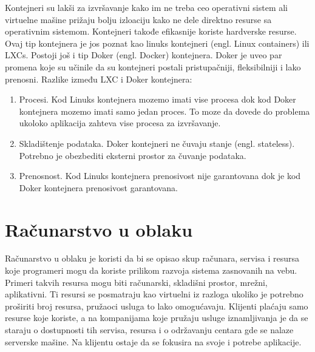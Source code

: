 \documentclass[12pt,oneside]{memoir}
\begin{document}
Kontejneri su lakši za izvršavanje kako im ne treba ceo operativni sistem ali virtuelne mašine prižaju bolju izloaciju kako ne dele direktno resurse sa operativnim sistemom. Kontejneri takođe efikasnije koriste hardverske resurse. Ovaj tip kontejnera je jos poznat kao linuks kontejneri (engl. Linux containers) ili LXCs. Postoji još i tip Doker (engl. Docker) kontejnera. Doker je uveo par promena koje su učinile da su kontejneri postali pristupačniji, fleksibilniji i lako prenosni\cite{gswc}. Razlike između LXC i Doker kontejnera:
\begin{enumerate}
  \item Procesi. Kod Linuks kontejnera mozemo imati vise procesa dok kod Doker kontejnera mozemo imati samo jedan proces. To moze da dovede do problema ukoloko aplikacija zahteva vise procesa za izvršavanje.
  \item Skladištenje podataka. Doker kontejneri ne čuvaju stanje (engl. stateless). Potrebno je obezbediti eksterni prostor za čuvanje podataka.
  \item Prenosnost. Kod Linuks kontejnera prenosivost nije garantovana dok je kod Doker kontejnera prenosivost garantovana.
\end{enumerate}

\section{Računarstvo u oblaku}

Računarstvo u oblaku je koristi da bi se opisao skup računara, servisa i resursa koje programeri mogu da koriste prilikom razvoja sistema zasnovanih na vebu. Primeri takvih resursa mogu biti računarski, skladišni prostor, mrežni, aplikativni. Ti resursi se posmatraju kao virtuelni iz razloga ukoliko je potrebno proširiti broj resursa, pružaoci usluga to lako omogućavaju. Klijenti plaćaju samo resurse koje koriste, a na kompanijama koje pružaju usluge iznamljivanja je da se staraju o dostupnosti tih servisa, resursa i o održavanju centara gde se nalaze serverske mašine. Na klijentu ostaje da se fokusira na svoje i potrebe aplikacije\cite{cc}.
\end{document}
